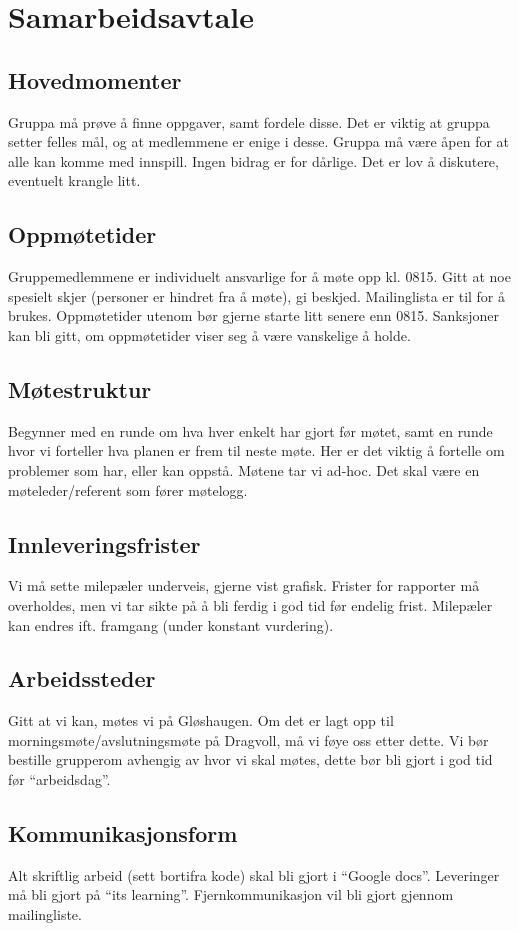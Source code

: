 \appendix {}
\section{Samarbeidsavtale} \label{A} 
\subsection{Hovedmomenter}
Gruppa må prøve å finne oppgaver, samt fordele disse. Det er viktig at gruppa setter felles mål, og at medlemmene er enige i desse. Gruppa må være åpen for at alle kan komme med innspill. Ingen bidrag er for dårlige. Det er lov å diskutere, eventuelt krangle litt.
\subsection{Oppmøtetider}
Gruppemedlemmene er individuelt ansvarlige for å møte opp kl. 0815. Gitt at noe spesielt skjer (personer er hindret fra å møte), gi beskjed. Mailinglista er til for å brukes. Oppmøtetider utenom bør gjerne starte litt senere enn 0815. Sanksjoner kan bli gitt, om oppmøtetider viser seg å være vanskelige å holde.
\subsection{Møtestruktur}
Begynner med en runde om hva hver enkelt har gjort før møtet, samt en runde hvor vi forteller hva planen er frem til neste møte. Her er det viktig å fortelle om problemer som har, eller kan oppstå. Møtene tar vi ad-hoc. Det skal være en møteleder/referent som fører møtelogg.
\subsection{Innleveringsfrister}
Vi må sette milepæler underveis, gjerne vist grafisk. Frister for rapporter må overholdes, men vi tar sikte på å bli ferdig i god tid før endelig frist. Milepæler kan endres ift. framgang (under konstant vurdering).
\subsection{Arbeidssteder}
Gitt at vi kan, møtes vi på Gløshaugen. Om det er lagt opp til morningsmøte/avslutningsmøte på Dragvoll, må vi føye oss etter dette. Vi bør bestille grupperom avhengig av hvor vi skal møtes, dette bør bli gjort i god tid før “arbeidsdag”.
\subsection{Kommunikasjonsform}
Alt skriftlig arbeid (sett bortifra kode) skal bli gjort i “Google docs”. Leveringer må bli gjort på “its learning”. Fjernkommunikasjon vil bli gjort gjennom mailingliste.
